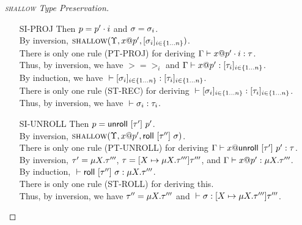 \begin{proof}[\textsc{shallow} Type Preservation]
\begin{itemize}
\begin{itemize}
	  By induction, $\tc{}{\refval{q}{\gt}}{\own{\gt}}$. \\
	  There are no rules for deriving $\tc{}{\refval{q}{\gt}}{\own{\gt}}$. \\
	  Thus, by inversion, this case is impossible.
	\item[PT-DEREF]
	  By inversion, $\tc{\gG}{\lv{x}{p'}}{\tyref{\lt}{q}{\gt}}$. \\
	  Since $\tc{}{\gU}{\gG}$ guarantees that $\gG(x)$ is closed
	  and a simple inspection of the path typing rules shows that
	  this implies all well typed paths have closed types,
	  we know that $\gt$ is closed. \\
	  By \textsc{init} Type Preservation, $\textsc{init}(\gt)=\gs$ implies $\tc{}{\gs}{\gt}$.
      \end{itemize}
    \item[SI-PROJ] Then $p = {p'}\cdot{i}$ and $\sigma = \sigma_i$. \\
      By inversion, $\textsc{shallow}({\Upsilon},{{x}@{p'}},{[{{\sigma}_{i}}]_{{i} \in \{1 \ldots {n}\} }})$. \\
      There is only one rule (\textsc{PT-PROJ}) for deriving 
      ${\Gamma} \vdash {{x}@{{p'}\cdot{i}}} : {\tau}$. \\
      Thus, by inversion, we have $\gt=\gt_i$ and ${\Gamma} \vdash {{x}@{p'}} : {[{{\tau}_{i}}]_{{i} \in \{1 \ldots {n}\} }}$. \\
      By induction, we have ${} \vdash {[{{\sigma}_{i}}]_{{i} \in \{1 \ldots {n}\} }} : {[{{\tau}_{i}}]_{{i} \in \{1 \ldots {n}\} }}$. \\
      There is only one rule (\textsc{ST-REC}) for 
      deriving ${} \vdash {[{{\sigma}_{i}}]_{{i} \in \{1 \ldots {n}\} }} : {[{{\tau}_{i}}]_{{i} \in \{1 \ldots {n}\} }}$. \\
      Thus, by inversion, we have ${} \vdash {\sigma_i} : {\tau_i}$.
    \item[SI-UNROLL] Then $p = \mathsf{unroll}~[{\tau'}]~{p'}$. \\
      By inversion, $\textsc{shallow}({\Upsilon},{{x}@{p'}},{\mathsf{roll}~[{\tau''}]~{\sigma}})$. \\
      There is only one rule (\textsc{PT-UNROLL}) for deriving
      ${\Gamma} \vdash {{x}@{\mathsf{unroll}~[{\tau'}]~{p'}}} : {\tau}$. \\
      By inversion, $\tau' = \mu {X}.{\tau'''}$, $\tau = [{X} \mapsto {\mu {X}.{\tau'''}}] {\tau'''}$,
      and ${\Gamma} \vdash {{x}@{p'}} : {\mu {X}.{\tau'''}}$. \\
      By induction, ${} \vdash {\mathsf{roll}~[{\tau''}]~{\sigma}} : {\mu {X}.{\tau'''}}$. \\
      There is only one rule (\textsc{ST-ROLL}) for deriving this. \\
      Thus, by inversion, we have $\tau'' = \mu {X}.{\tau'''}$ and 
      ${} \vdash {\sigma} : {[{X} \mapsto {\mu {X}.{\tau'''}}] {\tau'''}}$.
  \end{itemize}
\end{proof}


